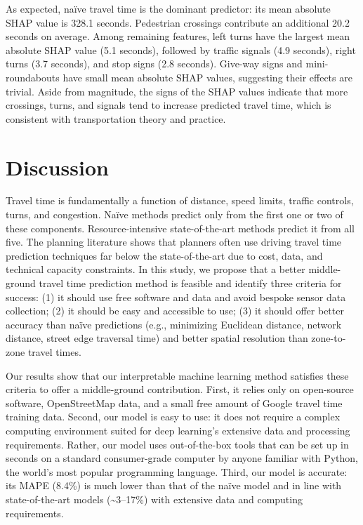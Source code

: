 \documentclass[12pt,letterpaper]{article} %
\begin{document}

As expected, naïve travel time is the dominant predictor: its mean absolute SHAP value is 328.1 seconds. Pedestrian crossings contribute an additional 20.2 seconds on average. Among remaining features, left turns have the largest mean absolute SHAP value (5.1 seconds), followed by traffic signals (4.9 seconds), right turns (3.7 seconds), and stop signs (2.8 seconds). Give-way signs and mini-roundabouts have small mean absolute SHAP values, suggesting their effects are trivial. Aside from magnitude, the signs of the SHAP values indicate that more crossings, turns, and signals tend to increase predicted travel time, which is consistent with transportation theory and practice.


\section{Discussion}

Travel time is fundamentally a function of distance, speed limits, traffic controls, turns, and congestion. Naïve methods predict only from the first one or two of these components. Resource-intensive state-of-the-art methods predict it from all five. The planning literature shows that planners often use driving travel time prediction techniques far below the state-of-the-art due to cost, data, and technical capacity constraints. In this study, we propose that a better middle-ground travel time prediction method is feasible and identify three criteria for success: (1) it should use free software and data and avoid bespoke sensor data collection; (2) it should be easy and accessible to use; (3) it should offer better accuracy than naïve predictions (e.g., minimizing Euclidean distance, network distance, street edge traversal time) and better spatial resolution than zone-to-zone travel times.

Our results show that our interpretable machine learning method satisfies these criteria to offer a middle-ground contribution. First, it relies only on open-source software, OpenStreetMap data, and a small free amount of Google travel time training data. Second, our model is easy to use: it does not require a complex computing environment suited for deep learning's extensive data and processing requirements. Rather, our model uses out-of-the-box tools that can be set up in seconds on a standard consumer-grade computer by anyone familiar with Python, the world's most popular programming language. Third, our model is accurate: its MAPE (8.4\%) is much lower than that of the naïve model and in line with state-of-the-art models (\textasciitilde3--17\%) with extensive data and computing requirements.
\end{document}
